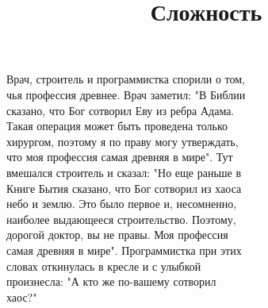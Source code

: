 \documentclass[11pt]{proc}
\title{\Huge \bf Сложность}
\begin{document}
\maketitle
\begin{flushleft}
  Врач, строитель и программистка спорили о том,\\ чья профессия древнее. Врач заметил: "В Библии\\ сказано, что Бог сотворил Еву из ребра Адама.\\ Такая операция может быть проведена только\\ хирургом, поэтому я по праву могу утверждать,\\ что моя профессия самая древняя в мире". Тут\\ вмешался строитель и сказал: "Но еще раньше в\\ Книге Бытия сказано, что Бог сотворил из хаоса\\ небо и землю. Это было первое и, несомненно,\\ наиболее выдающееся строительство. Поэтому,\\ дорогой доктор, вы не правы. Моя профессия\\ самая древняя в мире". Программистка при этих\\ словах откинулась в кресле и с улыбкой\\ произнесла: "А кто же по-вашему сотворил\\ хаос?"
\end{flushleft}
\end{document}
